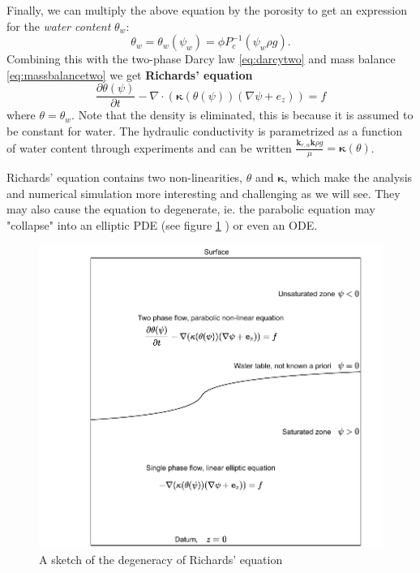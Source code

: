 \documentclass[../Main/main.tex]{subfiles}
\begin{document}
Finally, we can multiply the above equation by the porosity to get an expression for the \emph{water content} $\theta_w$:
\begin{equation*}
	\theta_w = \theta_w(\psi_w) = \phi P_c^{-1}(\psi_w\rho g).
\end{equation*}  
Combining this with the two-phase Darcy law \eqref{eq:darcytwo} and mass balance \eqref{eq:massbalancetwo} we get \textbf{Richards' equation}
\begin{equation}\label{eq:richards}
	\frac{\partial \theta(\psi)}{\partial t} - \nabla \cdot (\bm{\kappa} (\theta (\psi))(\nabla \psi + e_z)) = f
\end{equation}
where $\theta = \theta_w$. Note that the density is eliminated, this is because it is assumed to be constant for water. The hydraulic conductivity is parametrized as a function of water content through experiments and can be written  $\frac{\bm{k}_{r,\alpha}\bm{k}\rho g}{\mu} = \bm{\kappa}(\theta)$. \par 
Richards' equation contains two non-linearities, $\theta$ and $\bm{\kappa}$, which make the analysis and numerical simulation more interesting and challenging as we will see. They may also cause the equation to degenerate, ie. the parabolic equation may "collapse" into an elliptic PDE (see figure \ref{fig:richards} ) or even an ODE.
\begin{figure}[h]
	\centering
	\includegraphics[width=\textwidth]{Richards.pdf}
	\caption{A sketch of the degeneracy of Richards' equation}
	\label{fig:richards}
\end{figure}
 
\end{document}
